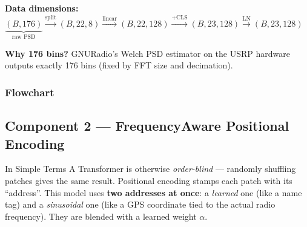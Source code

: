 \documentclass[11pt,a4paper]{article}
\begin{document}
\medskip\noindent
\textbf{Data dimensions:}
$\underbrace{(B,176)}_{\text{raw PSD}}
\xrightarrow{\text{split}}  (B,22,8)
\xrightarrow{\text{linear}} (B,22,128)
\xrightarrow{+\text{CLS}}   (B,23,128)
\xrightarrow{\text{LN}}     (B,23,128)$

\smallskip\noindent
\textbf{Why 176 bins?} GNURadio's Welch PSD estimator on the USRP hardware
outputs exactly 176 bins (fixed by FFT size and decimation).

\subsubsection{Flowchart}

\begin{center}
\end{center}

\subsection{Component 2 — FrequencyAware Positional Encoding}

\begin{note}{In Simple Terms}
A Transformer is otherwise \emph{order-blind} — randomly shuffling patches
gives the same result. Positional encoding stamps each patch with its
``address''. This model uses \textbf{two addresses at once}:
a \emph{learned} one (like a name tag) and a
\emph{sinusoidal} one (like a GPS coordinate tied to the actual
radio frequency). They are blended with a learned weight $\alpha$.
\end{note}
\end{document}
